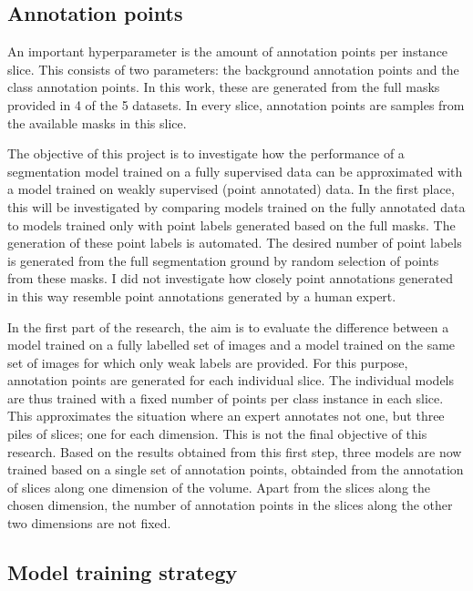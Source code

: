 \subsection{Annotation points}
\par{
    An important hyperparameter is the amount of annotation points per instance  slice.
    This consists of two parameters: the background annotation points and the class annotation points.
    In this work, these are generated from the full masks provided in 4 of the 5 datasets.
    In every slice, annotation points are samples from the available masks in this slice.
}
\par{
    The objective of this project is to investigate how the performance of a segmentation model trained on a fully supervised data can be approximated with a model trained on weakly supervised (point annotated) data.
    In the first place, this will be investigated by comparing models trained on the fully annotated data to models trained only with point labels generated based on the full masks.
    The generation of these point labels is automated. 
    The desired number of point labels is generated from the full segmentation ground by random selection of points from these masks.
    I did not investigate how closely point annotations generated in this way resemble point annotations generated by a human expert.
}
\par{
    In the first part of the research, the aim is to evaluate the difference between a model trained on a fully labelled set of images and a model trained on the same set of images for which only weak labels are provided.
    For this purpose, annotation points are generated for each individual slice.
    The individual models are thus trained with a fixed number of points per class instance in each slice. 
    This approximates the situation where an expert annotates not one, but three piles of slices; one for each dimension. This is not the final objective of this research.
    Based on the results obtained from this first step, three models are now trained based on a single set of annotation points, obtainded from the annotation of slices along one dimension of the volume.
    Apart from the slices along the chosen dimension, the number of annotation points in the slices along the other two dimensions are not fixed.
}
\newpage
\subsection{Model training strategy}

